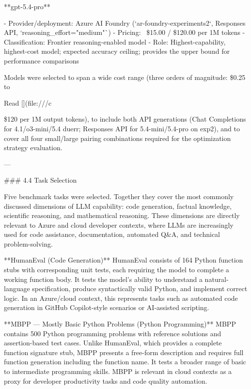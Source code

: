 **gpt-5.4-pro**

- Provider/deployment: Azure AI Foundry (`ar-foundry-experiments2`, Responses API, `reasoning_effort="medium"`)
- Pricing: ~\$15.00 / \$120.00 per 1M tokens
- Classification: Frontier reasoning-enabled model
- Role: Highest-capability, highest-cost model; expected accuracy ceiling; provides the upper bound for performance comparisons

Models were selected to span a wide cost range (three orders of magnitude: \$0.25 to

Read [](file:///c%

\$120 per 1M output tokens), to include both API generations (Chat Completions for 4.1/o3-mini/5.4 duerr; Responses API for 5.4-mini/5.4-pro on exp2), and to cover all four small/large pairing combinations required for the optimization strategy evaluation.

---

### 4.4 Task Selection

Five benchmark tasks were selected. Together they cover the most commonly discussed dimensions of LLM capability: code generation, factual knowledge, scientific reasoning, and mathematical reasoning. These dimensions are directly relevant to Azure and cloud developer contexts, where LLMs are increasingly used for code assistance, documentation, automated Q&A, and technical problem-solving.

**HumanEval (Code Generation)**
HumanEval consists of 164 Python function stubs with corresponding unit tests, each requiring the model to complete a working function body. It tests the model's ability to understand a natural-language specification, produce syntactically valid Python, and implement correct logic. In an Azure/cloud context, this represents tasks such as automated code generation in GitHub Copilot-style scenarios or AI-assisted scripting.

**MBPP — Mostly Basic Python Problems (Python Programming)**
MBPP contains 500 Python programming problems with reference solutions and assertion-based test cases. Unlike HumanEval, which provides a complete function signature stub, MBPP presents a free-form description and requires full function generation including the function name. It tests a broader range of basic to intermediate programming skills. MBPP is relevant in cloud contexts as a proxy for developer productivity tasks and code quality automation.


